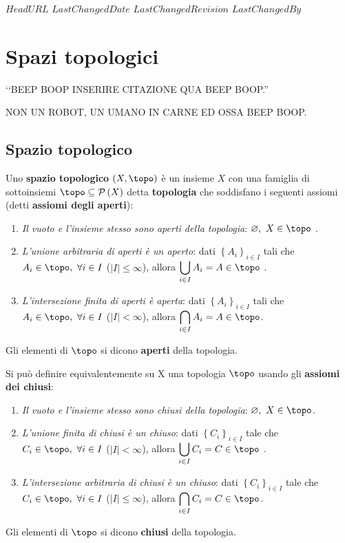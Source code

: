 \svnidlong
{$HeadURL$}
{$LastChangedDate$}
{$LastChangedRevision$}
{$LastChangedBy$}

\chapter{Spazi topologici}

\begin{introduction}
	‘‘BEEP BOOP INSERIRE CITAZIONE QUA BEEP BOOP.''
	\begin{flushright}
		\textsc{NON UN ROBOT,} UN UMANO IN CARNE ED OSSA BEEP BOOP.
	\end{flushright}
\end{introduction}

\section{Spazio topologico}
\begin{define}
	Uno \textbf{spazio topologico} $\left(X, \topo\right)$ è un insieme $X$ con una famiglia di sottoinsiemi $\topo\subseteq\setpart{X}$ detta \textbf{topologia} che soddisfano i seguenti assiomi (detti \textbf{assiomi degli aperti}):
	\begin{enumerate}
		\item \textit{Il vuoto e l'insieme stesso sono aperti della topologia}: $\emptyset,\ X\in\topo$ .
		\item \textit{L'unione arbitraria di aperti è un aperto}: dati $\left\{A_i\right\}_{i\in I}$ tali che $A_i\in\topo,\ \forall i\in I$ ($|I|\leq \infty$), allora $\displaystyle\union_{i\in I}A_i=A\in\topo$ .
		\item \textit{L'intersezione finita di aperti è aperta}: dati $\left\{A_i\right\}_{i\in I}$ tali che $A_i\in\topo,\ \forall i\in I$ ($|I|< \infty$), allora $\displaystyle\inter_{i\in I}A_i=A\in\topo$.
	\end{enumerate}
	Gli elementi di $\topo$ si dicono \textbf{aperti} della topologia.
\end{define}

\begin{define} Si può definire equivalentemente su X una topologia $\topo$ usando gli \textbf{assiomi dei chiusi}:
	\begin{enumerate}
		\item \textit{Il vuoto e l'insieme stesso sono chiusi della topologia}: $\emptyset,\ X\in\topo$.
		\item \textit{L'unione finita di chiusi è un chiuso}: dati $\left\{C_i\right\}_{i\in I}$ tale che $C_i\in\topo,\ \forall i\in I$ ($|I|< \infty$), allora $\displaystyle\union_{i\in I}C_i=C\in\topo$ .
		\item \textit{L'intersezione arbitraria di chiusi è un chiuso}: dati $\left\{C_i\right\}_{i\in I}$ tale che $C_i\in\topo,\ \forall i\in I$ ($|I|\leq \infty$), allora $\displaystyle\inter_{i\in I}C_i=C\in\topo$.
	\end{enumerate}
	Gli elementi di $\topo$ si dicono \textbf{chiusi} della topologia.
\end{define}

